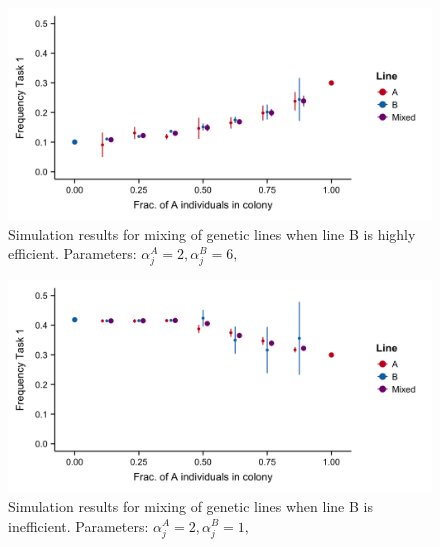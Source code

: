 \documentclass[11pt]{article}
\begin{document}
\begin{figure}[H]
    \centering
    \includegraphics[trim={0 0.25in 0 0.2in}, clip, width=0.9\linewidth]{doc/Mix_Alphas_B-super-efficient_Means.png}
    \caption{Simulation results for mixing of genetic lines when line B is highly efficient. Parameters: $\alpha_j^A = 2, \alpha_j^B = 6,$}
    \label{fig:Mix_Alphas_B-efficient}
\end{figure}

\begin{figure}[H]
    \centering
    \includegraphics[trim={0 0.25in 0 0.2in}, clip, width=0.9\linewidth]{Mix_Alphas_B-inefficient_Means.png}
    \caption{Simulation results for mixing of genetic lines when line B is inefficient. Parameters: $\alpha_j^A = 2, \alpha_j^B = 1,$}
    \label{fig:Mix_Alphas_B-inefficient}
\end{figure}
\end{document}
